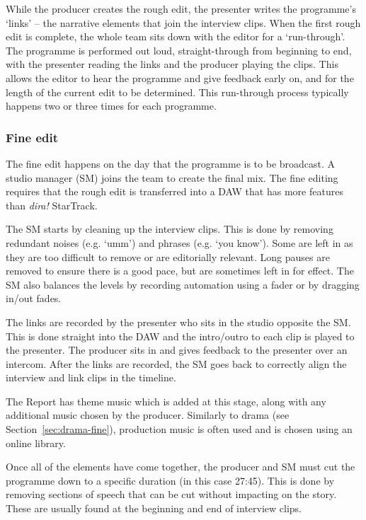 While the producer creates the rough edit, the presenter writes the programme's
`links' -- the narrative elements that join the interview clips. When the first
rough edit is complete, the whole team sits down with the editor for a
`run-through'. The programme is performed out loud, straight-through from
beginning to end, with the presenter reading the links and the producer playing
the clips. This allows the editor to hear the programme and give feedback early
on, and for the length of the current edit to be determined. This run-through
process typically happens two or three times for each programme.

\subsubsection{Fine edit}
The fine edit happens on the day that the programme is to be broadcast. A
studio manager (SM) joins the team to create the final mix. The fine editing
requires that the rough edit is transferred into a DAW that has more features
than \textit{dira!} StarTrack.

The SM starts by cleaning up the interview clips. This is done by removing
redundant noises (e.g. `umm') and phrases (e.g. `you know'). Some are left in
as they are too difficult to remove or are editorially relevant. Long pauses
are removed to ensure there is a good pace, but are sometimes left in for
effect.  The SM also balances the levels by recording automation using a fader
or by dragging in/out fades. 

The links are recorded by the presenter who sits in the studio opposite the SM.
This is done straight into the DAW and the intro/outro to each clip is played
to the presenter. The producer sits in and gives feedback to the presenter over
an intercom. After the links are recorded, the SM goes back to correctly align
the interview and link clips in the timeline.

The Report has theme music which is added at this stage, along with any
additional music chosen by the producer. Similarly to drama (see
Section~\ref{sec:drama-fine}), production music is often used and is chosen
using an online library.

Once all of the elements have come together, the producer and SM must cut the
programme down to a specific duration (in this case 27:45). This is done by
removing sections of speech that can be cut without impacting on the story.
These are usually found at the beginning and end of interview clips.

